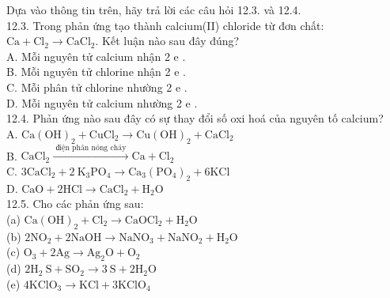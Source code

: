 \documentclass[10pt]{article}
\begin{document}
Dựa vào thông tin trên, hãy trả lời các câu hỏi 12.3. và 12.4.\\
12.3. Trong phản ứng tạo thành calcium(II) chloride từ đơn chất: $\mathrm{Ca}+\mathrm{Cl}_{2} \rightarrow \mathrm{CaCl}_{2}$. Kết luận nào sau đây đúng?\\
A. Mỗi nguyên tử calcium nhận 2 e .\\
B. Mỗi nguyên tử chlorine nhận 2 e .\\
C. Mỗi phân tử chlorine nhường 2 e .\\
D. Mỗi nguyên tử calcium nhường 2 e .\\
12.4. Phản ứng nào sau đây có sự thay đổi số oxi hoá của nguyên tố calcium?\\
A. $\mathrm{Ca}(\mathrm{OH})_{2}+\mathrm{CuCl}_{2} \rightarrow \mathrm{Cu}(\mathrm{OH})_{2}+\mathrm{CaCl}_{2}$\\
B. $\mathrm{CaCl}_{2} \xrightarrow{\text { điện phân nóng chảy }} \mathrm{Ca}+\mathrm{Cl}_{2}$\\
C. $3 \mathrm{CaCl}_{2}+2 \mathrm{~K}_{3} \mathrm{PO}_{4} \rightarrow \mathrm{Ca}_{3}\left(\mathrm{PO}_{4}\right)_{2}+6 \mathrm{KCl}$\\
D. $\mathrm{CaO}+2 \mathrm{HCl} \rightarrow \mathrm{CaCl}_{2}+\mathrm{H}_{2} \mathrm{O}$\\
12.5. Cho các phản ứng sau:\\
(a) $\mathrm{Ca}(\mathrm{OH})_{2}+\mathrm{Cl}_{2} \rightarrow \mathrm{CaOCl}_{2}+\mathrm{H}_{2} \mathrm{O}$\\
(b) $2 \mathrm{NO}_{2}+2 \mathrm{NaOH} \rightarrow \mathrm{NaNO}_{3}+\mathrm{NaNO}_{2}+\mathrm{H}_{2} \mathrm{O}$\\
(c) $\mathrm{O}_{3}+2 \mathrm{Ag} \rightarrow \mathrm{Ag}_{2} \mathrm{O}+\mathrm{O}_{2}$\\
(d) $2 \mathrm{H}_{2} \mathrm{~S}+\mathrm{SO}_{2} \rightarrow 3 \mathrm{~S}+2 \mathrm{H}_{2} \mathrm{O}$\\
(e) $4 \mathrm{KClO}_{3} \rightarrow \mathrm{KCl}+3 \mathrm{KClO}_{4}$
\end{document}

